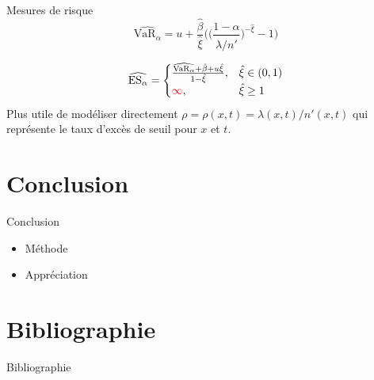 \documentclass[aspectratio=169, 12pt, french]{beamer}
\begin{document}
\begin{frame}{Mesures de risque}
\begin{equation}
\widehat{\text{VaR}_\alpha} = u + \frac{\hat\beta}{\hat\xi} \Bigg(\Bigg( \frac{1-\alpha}{\hat\lambda/n'}\Bigg)^{-\hat\xi} -1 \Bigg)
\end{equation} \pause

\begin{equation}
\widehat{\text{ES}_\alpha} =
\begin{cases}
\frac{\widehat{\text{VaR}_\alpha} + \hat\beta + u\hat\xi}{1-\hat\xi}, & \hat{\xi} \in (0,1) \\
\textcolor{red} \infty, & \hat\xi 	\ge 1
\end{cases}
\end{equation} \pause
Plus utile de modéliser directement $\rho = \rho(x, t) = \lambda(x,t)/n'(x, t)$ qui représente le taux d'excès de seuil pour $x$ et $t$.
\end{frame}





\section{Conclusion}
\begin{frame}{Conclusion}
\begin{itemize}
\item Méthode
\item Appréciation
\end{itemize}
\end{frame}


\begin{frame}
\centering
\Huge{}
\end{frame}

\section*{Bibliographie}
\nocite{*}

\begin{frame}[allowframebreaks]{Bibliographie}

\end{frame}
\end{document}
